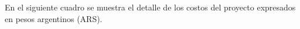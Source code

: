 \documentclass[
11pt, %
]{charter}
\begin{document}




En el siguiente cuadro se muestra el detalle de los costos del proyecto expresados en pesos argentinos (ARS).
\end{document}
